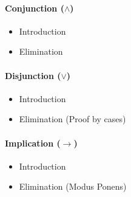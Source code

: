 \paragraph{Conjunction ($\land$)}
\begin{itemize}
    \item Introduction
    \begin{prooftree}
    \end{prooftree}
    \item Elimination
    \begin{prooftree}
    \end{prooftree}
    \qquad
    \begin{prooftree}
    \end{prooftree}
\end{itemize}
\paragraph{Disjunction ($\lor$)}
\begin{itemize}
    \item Introduction
    \begin{prooftree}
    \end{prooftree}
    \qquad
    \begin{prooftree}
    \end{prooftree}
    \item Elimination (Proof by cases)
    \begin{prooftree}
    \end{prooftree}
\end{itemize}
\paragraph{Implication ($\to$)}
\begin{itemize}
    \item Introduction
    \begin{prooftree}
    \end{prooftree}
    \item Elimination (Modus Ponens)
    \begin{prooftree}
    \end{prooftree}
\end{itemize}

